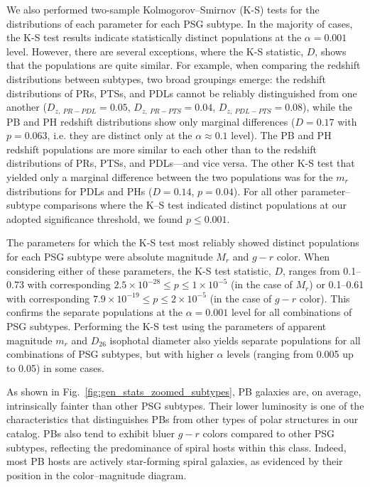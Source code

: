 \documentclass{aa}
\begin{document}
We also performed two-sample Kolmogorov--Smirnov (K-S) tests for the distributions of each parameter for each PSG subtype. In the majority of cases, the K-S test results indicate statistically distinct populations at the $\alpha = 0.001$ level. However, there are several exceptions, where the K-S statistic, $D$, shows that the populations are quite similar. For example, when comparing the redshift distributions between subtypes, two broad groupings emerge: the redshift distributions of PRs, PTSs, and PDLs cannot be reliably distinguished from one another ($D_{z,~PR-PDL}=0.05$, $D_{z,~PR-PTS}=0.04$, $D_{z,~PDL-PTS}=0.08$), while the PB and PH redshift distributions show only marginal differences ($D=0.17$ with $p = 0.063$, i.e. they are distinct only at the $\alpha \approx 0.1$ level). The PB and PH redshift populations are more similar to each other than to the redshift distributions of PRs, PTSs, and PDLs---and vice versa. The other K-S test that yielded only a marginal difference between the two populations was for the $m_r$ distributions for PDLs and PHs ($D=0.14$, $p=0.04$). For all other parameter--subtype comparisons where the K--S test indicated distinct populations at our adopted significance threshold, we found $p \le 0.001$.

The parameters for which the K-S test most reliably showed distinct populations for each PSG subtype were absolute magnitude $M_r$ and $g-r$ color. When considering either of these parameters, the K-S test statistic, $D$, ranges from 0.1--0.73 with corresponding $2.5\times10^{-28} \le p \le 1\times10^{-5}$ (in the case of $M_r$) or 0.1--0.61 with corresponding $7.9\times10^{-19} \le p \le 2\times10^{-5}$ (in the case of $g-r$ color). This confirms the separate populations at the $\alpha=0.001$ level for all combinations of PSG subtypes. Performing the K-S test using the parameters of apparent magnitude $m_r$ and $D_{26}$ isophotal diameter also yields separate populations for all combinations of PSG subtypes, but with higher $\alpha$ levels (ranging from 0.005 up to 0.05) in some cases.

As shown in Fig.~\ref{fig:gen_stats_zoomed_subtypes}, PB galaxies are, on average, intrinsically fainter than other PSG subtypes. Their lower luminosity is one of the characteristics that distinguishes PBs from other types of polar structures in our catalog. PBs also tend to exhibit bluer $g-r$ colors compared to other PSG subtypes, reflecting the predominance of spiral hosts within this class. Indeed, most PB hosts are actively star-forming spiral galaxies, as evidenced by their position in the color–magnitude diagram.
\end{document}
